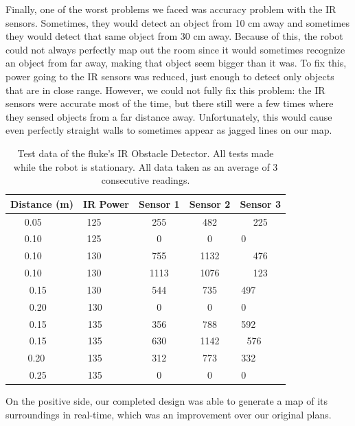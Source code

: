 \documentclass[12pt]{article}
\begin{document}
Finally, one of the worst problems we faced was accuracy problem with the IR sensors. Sometimes, they would detect an object from 10 cm away and sometimes they would detect that same object from 30 cm away. Because of this, the robot could not always perfectly map out the room since it would sometimes recognize an object from far away, making that object seem bigger than it was. To fix this, power going to the IR sensors was reduced, just enough to detect only objects that are in close range. However, we could not fully fix this problem: the IR sensors were accurate most of the time, but there still were a few times where they sensed objects from a far distance away. Unfortunately, this would cause even perfectly straight walls to sometimes appear as jagged lines on our map.\\

\begin{table}[ht]
\centering
  \caption{Test data of the fluke's IR Obstacle Detector. All tests made while the robot is stationary. All data taken as an average of 3 consecutive readings.}
  \begin{tabular}{ccccc}
  Distance (m) & IR Power & Sensor 1 & Sensor 2 & Sensor 3 \\ \hline
  0.05         & 125      & 255      & 482      & 225      \\
  0.10         & 125      & 0        & 0        & 0        \\
  0.10         & 130      & 755      & 1132     & 476      \\
  0.10         & 130      & 1113     & 1076     & 123      \\
  0.15         & 130      & 544      & 735      & 497      \\
  0.20         & 130      & 0        & 0        & 0        \\
  0.15         & 135      & 356      & 788      & 592      \\
  0.15         & 135      & 630      & 1142     & 576      \\
  0.20         & 135      & 312      & 773      & 332      \\
  0.25         & 135      & 0        & 0        & 0        \\ \hline
  \end{tabular}
\end{table}

On the positive side, our completed design was able to generate a map of its surroundings in real-time, which was an improvement over our original plans.\\
\end{document}
